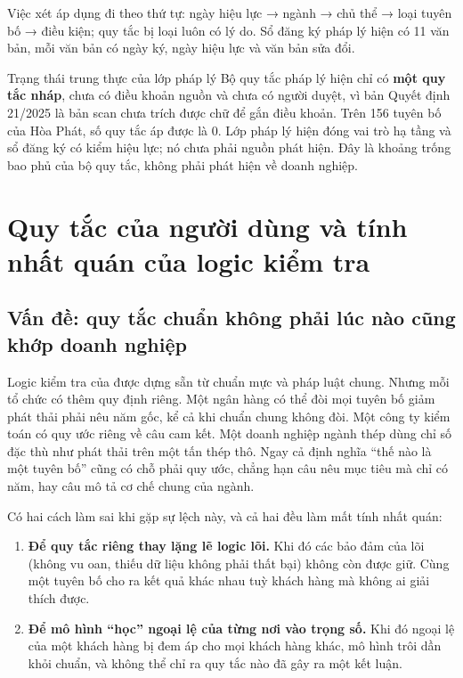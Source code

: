 Việc xét áp dụng đi theo thứ tự: ngày hiệu lực → ngành → chủ thể → loại tuyên bố → điều kiện; quy tắc bị loại luôn có lý do. Sổ đăng ký pháp lý hiện có 11 văn bản, mỗi văn bản có ngày ký, ngày hiệu lực và văn bản sửa đổi.

\begin{luuy}{Trạng thái trung thực của lớp pháp lý}
Bộ quy tắc pháp lý hiện chỉ có \textbf{một quy tắc nháp}, chưa có điều khoản nguồn và chưa có người duyệt, vì bản Quyết định 21/2025 là bản scan chưa trích được chữ để gắn điều khoản. Trên 156 tuyên bố của Hòa Phát, số quy tắc áp được là 0. Lớp pháp lý hiện đóng vai trò hạ tầng và sổ đăng ký có kiểm hiệu lực; nó chưa phải nguồn phát hiện. Đây là khoảng trống bao phủ của bộ quy tắc, không phải phát hiện về doanh nghiệp.
\end{luuy}

\section{Quy tắc của người dùng và tính nhất quán của logic kiểm tra}\label{sec:quy-tac-nguoi-dung}

\subsection{Vấn đề: quy tắc chuẩn không phải lúc nào cũng khớp doanh nghiệp}

Logic kiểm tra của \tensp{} được dựng sẵn từ chuẩn mực và pháp luật chung. Nhưng mỗi tổ chức có thêm quy định riêng. Một ngân hàng có thể đòi mọi tuyên bố giảm phát thải phải nêu năm gốc, kể cả khi chuẩn chung không đòi. Một công ty kiểm toán có quy ước riêng về câu cam kết. Một doanh nghiệp ngành thép dùng chỉ số đặc thù như phát thải trên một tấn thép thô. Ngay cả định nghĩa “thế nào là một tuyên bố” cũng có chỗ phải quy ước, chẳng hạn câu nêu mục tiêu mà chỉ có năm, hay câu mô tả cơ chế chung của ngành.

Có hai cách làm sai khi gặp sự lệch này, và cả hai đều làm mất tính nhất quán:
\begin{enumerate}
\item \textbf{Để quy tắc riêng thay lặng lẽ logic lõi.} Khi đó các bảo đảm của lõi (không vu oan, thiếu dữ liệu không phải thất bại) không còn được giữ. Cùng một tuyên bố cho ra kết quả khác nhau tuỳ khách hàng mà không ai giải thích được.
\item \textbf{Để mô hình “học” ngoại lệ của từng nơi vào trọng số.} Khi đó ngoại lệ của một khách hàng bị đem áp cho mọi khách hàng khác, mô hình trôi dần khỏi chuẩn, và không thể chỉ ra quy tắc nào đã gây ra một kết luận.
\end{enumerate}

